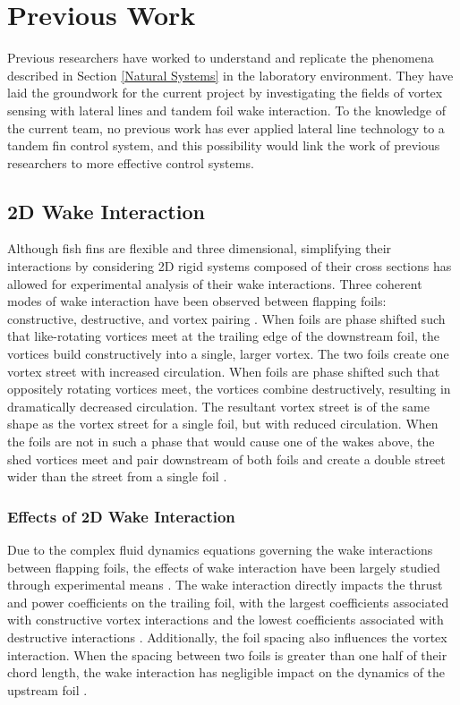 \section{Previous Work}

    Previous researchers have worked to understand and replicate the phenomena described in Section \ref{Natural Systems} in the laboratory environment. They have laid the groundwork for the current project by investigating the fields of vortex sensing with lateral lines and tandem foil wake interaction. To the knowledge of the current team, no previous work has ever applied lateral line technology to a tandem fin control system, and this possibility would link the work of previous researchers to more effective control systems.

\subsection{2D Wake Interaction} \label{2D Wake Interaction}

    Although fish fins are flexible and three dimensional, simplifying their interactions by considering 2D rigid systems composed of their cross sections has allowed for experimental analysis of their wake interactions. Three coherent modes of wake interaction have been observed between flapping foils: constructive, destructive, and vortex pairing \citep{Gopalkrishnan1994}. When foils are phase shifted such that like-rotating vortices meet at the trailing edge of the downstream foil, the vortices build constructively into a single, larger vortex. The two foils create one vortex street with increased circulation. When foils are phase shifted such that oppositely rotating vortices meet, the vortices combine destructively, resulting in dramatically decreased circulation. The resultant vortex street is of the same shape as the vortex street for a single foil, but with reduced circulation. When the foils are not in such a phase that would cause one of the wakes above, the shed vortices meet and pair downstream of both foils and create a double street wider than the street from a single foil \citep{Gopalkrishnan1994}.

\subsubsection{Effects of 2D Wake Interaction} \label{Effects of 2D Wake Interaction}

    Due to the complex fluid dynamics equations governing the wake interactions between flapping foils, the effects of wake interaction have been largely studied through experimental means \citep{Boschitsch2014}. The wake interaction directly impacts the thrust and power coefficients on the trailing foil, with the largest coefficients associated with constructive vortex interactions and the lowest coefficients associated with destructive interactions \citep{Gopalkrishnan1994, Boschitsch2014, Muscutt2017}. Additionally, the foil spacing also influences the vortex interaction. When the spacing between two foils is greater than one half of their chord length, the wake interaction has negligible impact on the dynamics of the upstream foil \citep{Boschitsch2014}.

